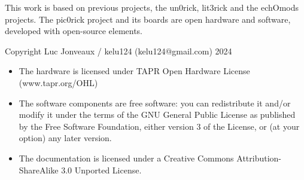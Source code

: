 \documentclass{article}
\begin{document}
%
%                                                                      
%

This work is based on previous projects, the un0rick, lit3rick and the echOmods projects. The pic0rick project and its boards are open hardware and software, developed with open-source elements.

Copyright Luc Jonveaux / kelu124 (kelu124@gmail.com) 2024

\begin{itemize}
\item The hardware is licensed under TAPR Open Hardware License (www.tapr.org/OHL)
\item The software components are free software: you can redistribute it and/or modify it under the terms of the GNU General Public License as published by the Free Software Foundation, either version 3 of the License, or (at your option) any later version.
\item The documentation is licensed under a Creative Commons Attribution-ShareAlike 3.0 Unported License.
\end{itemize}



  
\end{document}
